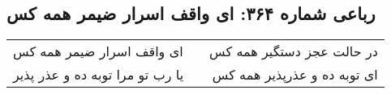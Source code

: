 \begin{center}
\section*{رباعی شماره ۳۶۴: ای واقف اسرار ضیمر همه کس}
\label{sec:sh364}
\begin{longtable}{l p{0.5cm} r}
ای واقف اسرار ضیمر همه کس
&&
در حالت عجز دستگیر همه کس
\\
یا رب تو مرا توبه ده و عذر پذیر
&&
ای توبه ده و عذرپذیر همه کس
\\
\end{longtable}
\end{center}
